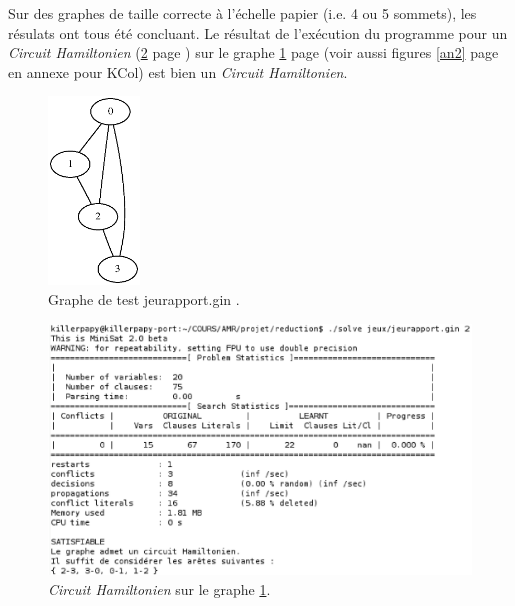   \indent Sur des graphes de taille correcte à l'échelle papier (i.e. 4
  ou 5 sommets), les résulats ont tous été concluant. Le résultat de
  l'exécution du programme pour un \emph{Circuit Hamiltonien} (\ref{ham}
  page \pageref{ham}) sur le graphe \ref{graphe1} page \pageref{graphe1} 
  (voir aussi figures \ref{an2} page \pageref{an2} en annexe pour KCol)
  est bien un \emph{Circuit Hamiltonien}.

  \begin{figure}[!ht]
   \begin{center}
    \includegraphics[height=5cm]{images/jeurap.ps}
    \caption{Graphe de test jeurapport.gin .\label{graphe1}}
   \end{center}
  \end{figure}

  \begin{figure}[!ht]
   \begin{center}
    \includegraphics[width=12cm]{images/chemin.eps}
    \caption{\emph{Circuit Hamiltonien} sur le graphe
    \ref{graphe1}.\label{ham}}
   \end{center}
  \end{figure}